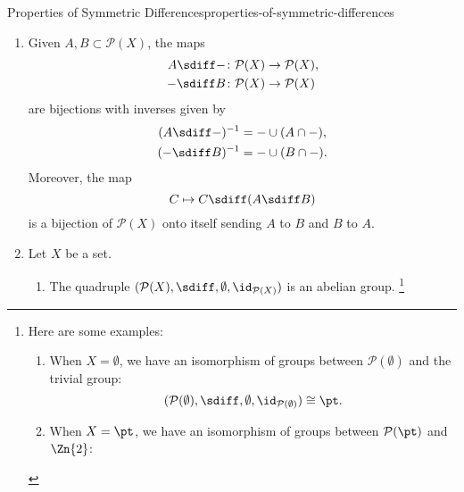 \begin{proposition}{Properties of Symmetric Differences}{properties-of-symmetric-differences}
\begin{enumerate}
\[                \chi_{V}%
                -%
                2\chi_{U\cap V}%
            \]%
            and thus, in particular, we have
            \[
                \chi_{U\sdiff V}%
                \equiv%
                \chi_{U}+\chi_{V}%
                \mod{2}%
            \]%
            for each $X\in\Obj(\Sets)$ and each $U,V\in\mathcal{P}(X)$.
        \item\label{properties-of-symmetric-differences-bijectivity}Given $A,B\subset\mathcal{P}(X)$, the maps
            \begin{align*}
                A\sdiff-  &\colon \mathcal{P}(X) \to \mathcal{P}(X),\\
                -\sdiff B &\colon \mathcal{P}(X) \to \mathcal{P}(X)
            \end{align*}
            are bijections with inverses given by
            \begin{align*}
                (A\sdiff-)^{-1}  &= -\cup(A\cap-),\\
                (-\sdiff B)^{-1} &= -\cup(B\cap-).
            \end{align*}
            Moreover, the map
            \[
                C\mapsto C\sdiff(A\sdiff B)%
            \]%
            is a bijection of $\mathcal{P}(X)$ onto itself sending $A$ to $B$ and $B$ to $A$.
        \item\label{properties-of-symmetric-differences-interaction-with-powersets-and-groups}Let $X$ be a set.
            \begin{enumerate}
                \item\label{properties-of-symmetric-differences-interaction-with-powersets-and-groups-a}The quadruple $(\mathcal{P}(X),\sdiff,\emptyset,\id_{\mathcal{P}(X)})$ is an abelian group.%
                    \footnote{%
                        Here are some examples:
                        \begin{enumerate}
                            \item When $X=\emptyset$, we have an isomorphism of groups between $\mathcal{P}(\emptyset)$ and the trivial group:
                                \[
                                    (\mathcal{P}(\emptyset),\sdiff,\emptyset,\id_{\mathcal{P}(\emptyset)})
                                    \cong
                                    \pt.
                                \]%
                            \item When $X=\pt$, we have an isomorphism of groups between $\mathcal{P}(\pt)$ and $\Zn{2}$:

\end{enumerate}}
\end{enumerate}
\end{enumerate}
\end{proposition}
